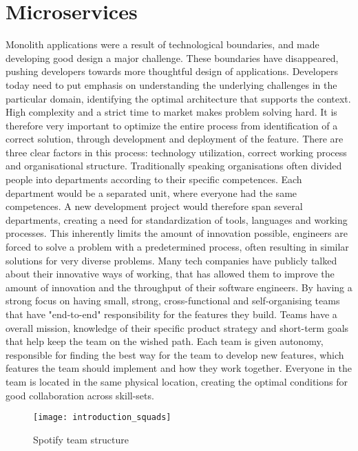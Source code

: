 \section{Microservices}
Monolith applications were a result of technological boundaries, and made developing good design a major challenge. These boundaries have disappeared, pushing developers towards more thoughtful design of applications. Developers today need to put emphasis on understanding the underlying challenges in the particular domain, identifying the optimal architecture that supports the context\cite{evans2016tackling}. High complexity and a strict time to market makes problem solving hard. It is therefore very important to optimize the entire process from identification of a correct solution, through development and deployment of the feature. There are three clear factors in this process: technology utilization, correct working process and organisational structure\cite{george2016it}. Traditionally speaking organisations often divided people into departments according to their specific competences. Each department would be a separated unit, where everyone had the same competences. A new development project would therefore span several departments, creating a need for standardization of tools, languages and working processes. This inherently limits the amount of innovation possible, engineers are forced to solve a problem with a predetermined process, often resulting in similar solutions for very diverse problems\cite{george2016it}. 
Many tech companies have publicly talked about their innovative ways of working, that has allowed them to improve the amount of innovation and the throughput of their software engineers\cite{kniberg2014spotify}. By having a strong focus on having small, strong, cross-functional and self-organising teams that have "end-to-end" responsibility for the features they build. Teams have a overall mission, knowledge of their specific product strategy and short-term goals that help keep the team on the wished path. Each team is given autonomy, responsible for finding the best way for the team to develop new features, which features the team should implement and how they work together. Everyone in the team is located in the same physical location, creating the optimal conditions for good collaboration across skill-sets\cite{kniberg2014spotify}.


\begin{figure}[!htb]
  \begin{center} 
	  \texttt{[image: introduction\_squads]}  
  \end{center}
  \caption{Spotify team structure}
  \label{fig:introduction_squads}
\end{figure}

